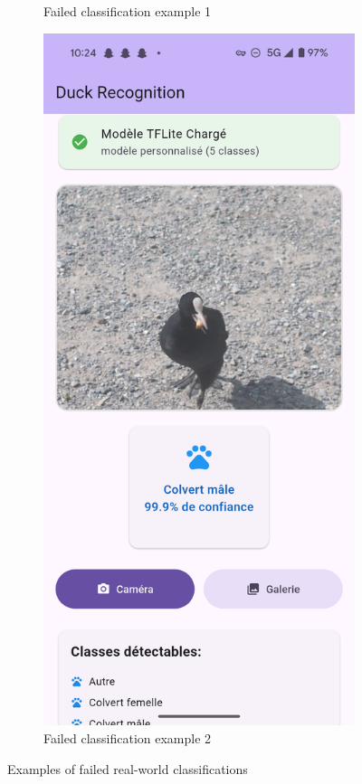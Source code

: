 \documentclass[12pt,a4paper]{article}
\begin{document}
\begin{figure}[H]
\begin{subfigure}[b]{0.45\textwidth}
        \caption{Failed classification example 1}
        \label{fig:fail1}
    \end{subfigure}
    \hfill
    \begin{subfigure}[b]{0.45\textwidth}
        \centering
        \includegraphics[width=\textwidth]{../../images/Results/Screenshot_20250615-102435.png}
        \caption{Failed classification example 2}
        \label{fig:fail2}
    \end{subfigure}
    \caption{Examples of failed real-world classifications}
    \label{fig:failed_classifications}
\end{figure}
\end{document}
